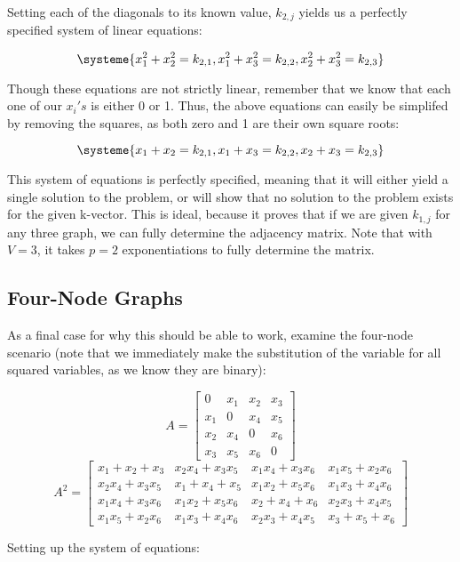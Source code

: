 \documentclass[a4paper,12pt]{article}
\begin{document}
Setting each of the diagonals to its known value, \(k_{2,j}\) yields us a perfectly specified system of linear equations:

\[\systeme{x_1^2 + x_2^2 = k_{2,1} , x_1^ 2 + x_3^2 = k_{2,2}, x_2^2 + x_3^2 = k_{2,3}}\]

Though these equations are not strictly linear, remember that we know that each one of our \(x_i's\) is either 0 or 1.
Thus, the above equations can easily be simplifed by removing the squares, as both zero and 1 are their own square roots:

\[\systeme{x_1 + x_2 = k_{2,1} , x_1 + x_3 = k_{2,2}, x_2 + x_3 = k_{2,3}}\]

This system of equations is perfectly specified, meaning that it will either yield a single solution to the problem, 
or will show that no solution to the problem exists for the given k-vector.
This is ideal, because it proves that if we are given \(k_{1,j}\) for any three graph, we can fully determine the
adjacency matrix.  Note that with \(V=3\), it takes \(p=2\) exponentiations to fully determine the matrix.

\subsection*{Four-Node Graphs}

As a final case for why this should be able to work, examine the four-node scenario (note that we immediately make the substitution of the variable for all squared variables, as we know they are binary):

\[ 
A = \left[\begin{array}{cccc}
0 & x_1 & x_2 & x_3 \\
x_1 & 0 & x_4 & x_5 \\
x_2 & x_4 & 0 & x_6 \\
x_3 & x_5 & x_6 & 0
 \end{array} \right]
\]
\[ A^2 = 
 \left[\begin{array}{cccc}
x_1 + x_2 + x_3 & x_2 x_4 + x_3 x_5 & x_1 x_4 + x_3 x_6 & x_1 x_5 + x_2 x_6 \\
x_2 x_4 + x_3 x_5 & x_1 + x_4 + x_5 & x_1 x_2 + x_5 x_6 & x_1 x_3 + x_4 x_6 \\
x_1 x_4 + x_3 x_6 & x_1 x_2 + x_5 x_6 & x_2 + x_4 + x_6 & x_2 x_3 + x_4 x_5 \\
x_1 x_5 + x_2 x_6 & x_1 x_3 + x_4 x_6 & x_2 x_3 + x_4 x_5 & x_3 + x_5 + x_6
 \end{array} \right] 
\]

Setting up the system of equations:
\end{document}
